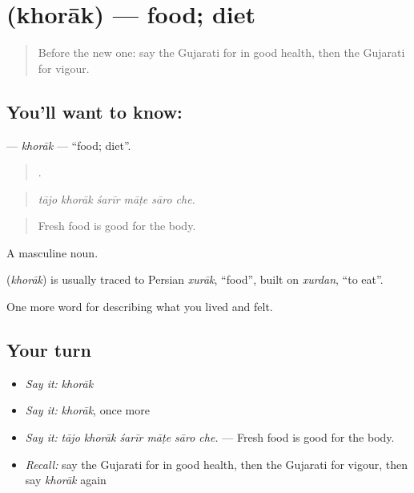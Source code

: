 \section[\texorpdfstring{\gu{ખોરાક} (khorāk)}{ખોરાક (khorāk)}]{ (khorāk) — food; diet}

\label{lesson:GU-C486-khorak}



\begin{quote}
Before the new one: say the Gujarati for in good health, then the Gujarati for vigour.
\end{quote}

\subsection*{You'll want to know: }
\textbf{} — \emph{khorāk} — \textquotedblleft{}food; diet\textquotedblright{}.

\begin{quote}
     .
\end{quote}

\begin{quote}
\emph{tājo khorāk śarīr māṭe sāro che.}
\end{quote}

\begin{quote}
Fresh food is good for the body.
\end{quote}

A masculine noun.

\begin{cousinweb}
\textbf{} (\emph{khorāk}) is usually traced to Persian \emph{xurāk}, \textquotedblleft{}food\textquotedblright{}, built on \emph{xurdan}, \textquotedblleft{}to eat\textquotedblright{}.
\end{cousinweb}

\begin{grammarlens}[title={What you've built}]
One more word for describing what you lived and felt.
\end{grammarlens}

\subsection*{Your turn}
\begin{itemize}
\raggedright
  \item \emph{Say it:} \emph{khorāk}
  \item \emph{Say it:} \emph{khorāk}, once more
  \item \emph{Say it:} \emph{tājo khorāk śarīr māṭe sāro che.} — Fresh food is good for the body.
  \item \emph{Recall:} say the Gujarati for in good health, then the Gujarati for vigour, then say \emph{khorāk} again
\end{itemize}

